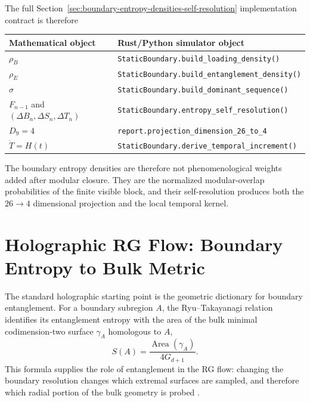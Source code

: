 \documentclass[11pt]{article}
\DeclareRobustCommand{\pyvar}[1]{%
  \ifmmode\text{\nolinkurl{#1}}\else\nolinkurl{#1}\fi%
}
\begin{document}
The full Section~\ref{sec:boundary-entropy-densities-self-resolution}
implementation contract is therefore
\begin{center}
\begin{tabular}{@{}ll@{}}
\toprule
Mathematical object & Rust/Python simulator object \\
\midrule
$\rho_B$ & \pyvar{StaticBoundary.build_loading_density()} \\
$\rho_E$ & \pyvar{StaticBoundary.build_entanglement_density()} \\
$\sigma$ & \pyvar{StaticBoundary.build_dominant_sequence()} \\
$F_{n-1}$ and $(\Delta B_n,\Delta S_n,\Delta T_n)$ & \pyvar{StaticBoundary.entropy_self_resolution()} \\
$D_9=4$ & \pyvar{report.projection_dimension_26_to_4} \\
$\dot T=H(t)$ & \pyvar{StaticBoundary.derive_temporal_increment()} \\
\bottomrule
\end{tabular}
\end{center}
The boundary entropy densities are therefore not phenomenological weights added
after modular closure.  They are the normalized modular-overlap probabilities
of the finite visible block, and their self-resolution produces both the
$26\to4$ dimensional projection and the local temporal kernel.

\section{Holographic RG Flow: Boundary Entropy to Bulk Metric}
\label{sec:holographic-rg-flow-boundary-entropy-bulk-metric}

The standard holographic starting point is the geometric dictionary for
boundary entanglement.  For a boundary subregion $A$, the Ryu--Takayanagi
relation identifies its entanglement entropy with the area of the bulk minimal
codimension-two surface $\gamma_A$ homologous to $A$,
\begin{equation}
\label{eq:section-five-rt-formula}
 S(A)
 =
 \frac{\operatorname{Area}(\gamma_A)}{4G_{d+1}}.
\end{equation}
This formula supplies the role of entanglement in the RG flow: changing the
boundary resolution changes which extremal surfaces are sampled, and therefore
which radial portion of the bulk geometry is probed
\cite{ryu2006,maldacena1998,gkp1998,witten1998}.
\end{document}
